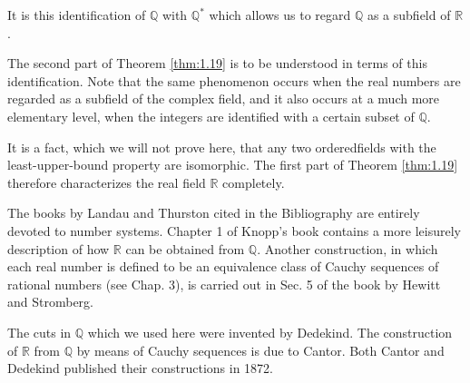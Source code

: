 It is this identification of $\mathbb{Q}$ with $\mathbb{Q}^*$ which allows us to regard $\mathbb{Q}$ as a subfield of $\mathbb{R}$.

The second part of Theorem \ref{thm:1.19} is to be understood in terms of this identification. Note that the same phenomenon occurs when the real numbers are regarded as a subfield of the complex field, and it also occurs at a much more elementary level, when the integers are identified with a certain subset of $\mathbb{Q}$.

It is a fact, which we will not prove here, that any two orderedfields with the least-upper-bound property are isomorphic. The first part of Theorem \ref{thm:1.19} therefore characterizes the real field $\mathbb{R}$ completely.

The books by Landau and Thurston cited in the Bibliography are entirely devoted to number systems. Chapter 1 of Knopp's book contains a more leisurely description of how $\mathbb{R}$ can be obtained from $\mathbb{Q}$. Another construction, in which each real number is defined to be an equivalence class of Cauchy sequences of rational numbers (see Chap. 3), is carried out in Sec. 5 of the book by Hewitt and Stromberg.

The cuts in $\mathbb{Q}$ which we used here were invented by Dedekind. The construction of $\mathbb{R}$ from $\mathbb{Q}$ by means of Cauchy sequences is due to Cantor. Both Cantor and Dedekind published their constructions in 1872.
